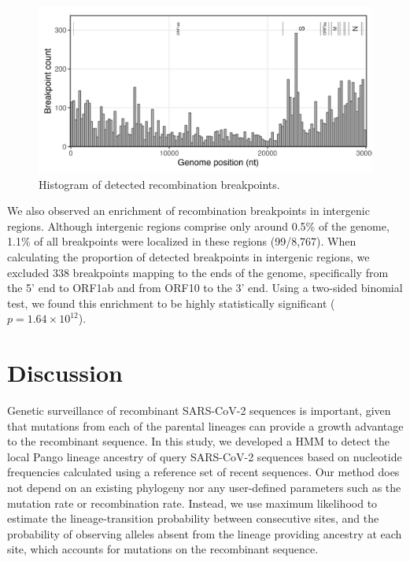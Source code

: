\documentclass[11pt,oneside,letterpaper]{article}
\begin{document}
\begin{figure}[H]
\centering
\includegraphics[width=\textwidth]{figures/hmm/recomb_hist_with_gene_intervals.png}
\caption[Histogram of detected recombination breakpoints]{Histogram of detected recombination breakpoints.}
\label{fig:hist}
\end{figure}

We also observed an enrichment of recombination breakpoints in intergenic regions. Although intergenic regions comprise only around 0.5\% of the genome, 1.1\% of all breakpoints were localized in these regions (99/8,767). When calculating the proportion of detected breakpoints in intergenic regions, we excluded 338 breakpoints mapping to the ends of the genome, specifically from the 5' end to ORF1ab and from ORF10 to the 3' end. Using a two-sided binomial test, we found this enrichment to be highly statistically significant ($p = 1.64\times 10^{12}$).

\section{Discussion}

Genetic surveillance of recombinant SARS-CoV-2 sequences is important, given that mutations from each of the parental lineages can provide a growth advantage to the recombinant sequence. In this study, we developed a HMM to detect the local Pango lineage ancestry of query SARS-CoV-2 sequences based on  nucleotide frequencies calculated using a reference set of recent sequences. Our method does not depend on an existing phylogeny nor any user-defined parameters such as the mutation rate or recombination rate. Instead, we use maximum likelihood to estimate the lineage-transition probability between consecutive sites, and the probability of observing alleles absent from the lineage providing ancestry at each site, which accounts for mutations on the recombinant sequence. 
\end{document}
